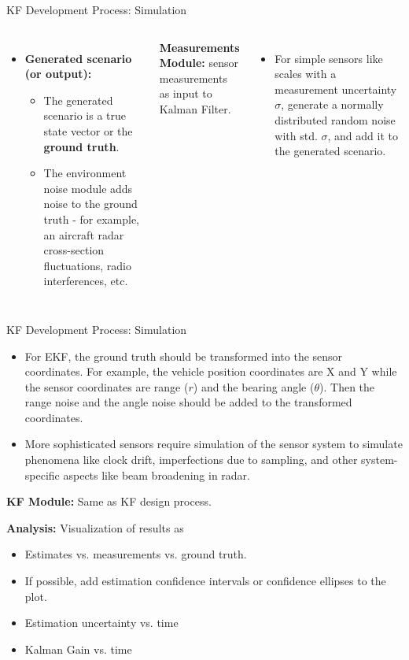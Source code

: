 \begin{frame}{KF Development Process: Simulation}
\begin{columns}
\begin{itemize}
        \item \textbf{Generated scenario (or output):} 
        \begin{itemize}
            \item The generated scenario is a true state vector or the \textbf{ground truth}.
            \item The environment noise module adds noise to the ground truth - for example, an aircraft radar cross-section fluctuations, radio interferences, etc.
        \end{itemize}
    \end{itemize}
    \textbf{Measurements Module:} sensor measurements as input to Kalman Filter.
    \begin{itemize}
        \item For simple sensors like scales with a measurement uncertainty $\sigma$, generate a normally distributed random noise with std. $\sigma$, and add it to the generated scenario.
    \end{itemize}
\end{columns}
\end{frame}


\begin{frame}{KF Development Process: Simulation}
    \begin{itemize}
        \item For EKF, the ground truth should be transformed into the sensor coordinates. For example, the vehicle position coordinates are X and Y while the sensor coordinates are range ($r$) and the bearing angle ($\theta$). Then the range noise and the angle noise should be added to the transformed coordinates.
        \item More sophisticated sensors require simulation of the sensor system to simulate phenomena like clock drift, imperfections due to sampling, and other system-specific aspects like beam broadening in radar.
    \end{itemize}

    \textbf{KF Module:} Same as KF design process.

    \textbf{Analysis:} Visualization of results as
    \begin{itemize}
        \item Estimates vs. measurements vs. ground truth.
        \item If possible, add estimation confidence intervals or confidence ellipses to the plot.
        \item Estimation uncertainty vs. time
        \item Kalman Gain vs. time
    \end{itemize}
\end{frame}


